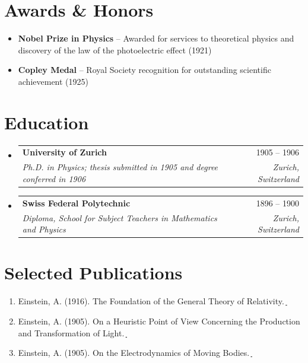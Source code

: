 \documentclass[letterpaper,10pt]{article}
\makeatletter
\newcommand{\pubicon}{{\,{\color{linkcolor}\scriptsize\faBook}}}
\newcommand{\paperlink}[1]{\,\href{#1}{\pubicon}}
\newcommand{\resumeItem}[1]{\item\small{#1 \vspace{-2pt}}}
\newcommand{\resumeHeading}[4]{
  \vspace{1pt}
  \item
    \begin{tabular*}{0.98\textwidth}[t]{l@{\extracolsep{\fill}}r}
      \textbf{#1} & \small #4 \\
      \textit{\small #3} & \textit{\small #2} \\
    \end{tabular*}\vspace{-7pt}
}
\newcommand{\resumeHeadingListStart}{\begin{itemize}[leftmargin=0pt, itemsep=0pt, label={}]}
\newcommand{\resumeHeadingListEnd}{\end{itemize}}
\newcommand{\resumeItemListStart}{\begin{itemize}[leftmargin=*, itemsep=1pt, topsep=1pt, parsep=0pt]}
\newcommand{\resumeItemListEnd}{\end{itemize}\vspace{-4pt}}
\makeatother
\begin{document}
\section{Awards \& Honors}
\resumeItemListStart
    \resumeItem{\textbf{Nobel Prize in Physics} -- Awarded for services to theoretical physics and discovery of the law of the photoelectric effect (1921)}
    \resumeItem{\textbf{Copley Medal} -- Royal Society recognition for outstanding scientific achievement (1925)}
\resumeItemListEnd

\section{Education}
\resumeHeadingListStart
  \resumeHeading
    {University of Zurich}
    {Zurich, Switzerland}
    {Ph.D. in Physics; thesis submitted in 1905 and degree conferred in 1906}
    {1905 -- 1906}
  \resumeHeading
    {Swiss Federal Polytechnic}
    {Zurich, Switzerland}
    {Diploma, School for Subject Teachers in Mathematics and Physics}
    {1896 -- 1900}
\resumeHeadingListEnd

\section{Selected Publications}
\begin{enumerate}[leftmargin=1.5em, label=\arabic*., itemsep=1pt, topsep=1pt]
    \item \small Einstein, A. (1916). The Foundation of the General Theory of Relativity.\paperlink{https://doi.org/10.1002/andp.19163540702}
    \item \small Einstein, A. (1905). On a Heuristic Point of View Concerning the Production and Transformation of Light.\paperlink{https://doi.org/10.1002/andp.19053220607}
    \item \small Einstein, A. (1905). On the Electrodynamics of Moving Bodies.\paperlink{https://inspirehep.net/literature/4181}
\end{enumerate}
\end{document}
